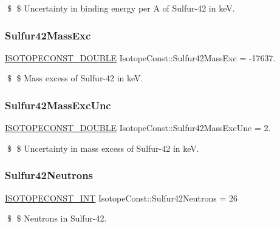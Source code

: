 \$ \$ Uncertainty in binding energy per A of Sulfur-\/42 in keV. \mbox{\label{group___isotope_const-_sulfur-_s42_ga27e692a106007ea6f61efeb952f3611f}} 
\subsubsection{\texorpdfstring{Sulfur42\+Mass\+Exc}{Sulfur42MassExc}}
{\footnotesize\ttfamily \mbox{\hyperlink{group___isotope_const-_macros_ga8f45a7272ce02c0b4c65c44636ed719a}{I\+S\+O\+T\+O\+P\+E\+C\+O\+N\+S\+T\+\_\+\+D\+O\+U\+B\+LE}} Isotope\+Const\+::\+Sulfur42\+Mass\+Exc = -\/17637.}

\$ \$ Mass excess of Sulfur-\/42 in keV. \mbox{\label{group___isotope_const-_sulfur-_s42_gaca945c2c9af5cfd4b0e7b8a17bcf7435}} 
\subsubsection{\texorpdfstring{Sulfur42\+Mass\+Exc\+Unc}{Sulfur42MassExcUnc}}
{\footnotesize\ttfamily \mbox{\hyperlink{group___isotope_const-_macros_ga8f45a7272ce02c0b4c65c44636ed719a}{I\+S\+O\+T\+O\+P\+E\+C\+O\+N\+S\+T\+\_\+\+D\+O\+U\+B\+LE}} Isotope\+Const\+::\+Sulfur42\+Mass\+Exc\+Unc = 2.}

\$ \$ Uncertainty in mass excess of Sulfur-\/42 in keV. \mbox{\label{group___isotope_const-_sulfur-_s42_gaa6a70401088b1e211543116a0ba7297a}} 
\subsubsection{\texorpdfstring{Sulfur42\+Neutrons}{Sulfur42Neutrons}}
{\footnotesize\ttfamily \mbox{\hyperlink{group___isotope_const-_macros_ga5f18360b3e99483a35c32d789e62621c}{I\+S\+O\+T\+O\+P\+E\+C\+O\+N\+S\+T\+\_\+\+I\+NT}} Isotope\+Const\+::\+Sulfur42\+Neutrons = 26}

\$ \$ Neutrons in Sulfur-\/42. \mbox{\label{group___isotope_const-_sulfur-_s42_ga0502bc830abca83441de84edac7fb83a}} 
